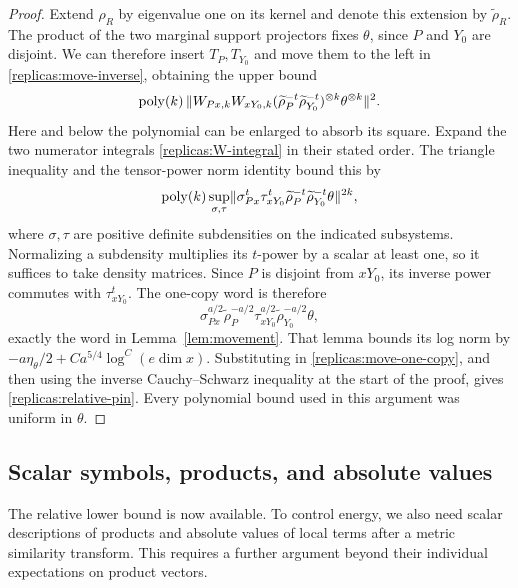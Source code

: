 \begin{proof}
Extend $\rho_R$ by eigenvalue one on its kernel and denote this
extension by $\widetilde\rho_R$.  The product of the two marginal
support projectors fixes $\theta$, since $P$ and $Y_0$ are disjoint.
We can therefore insert $T_P,T_{Y_0}$ and move them to the left in
\eqref{replicas:move-inverse}, obtaining the upper bound
\[
 \operatorname{poly}(k)\,
 \lVert W_{Px,k}W_{xY_0,k}
       (\widetilde\rho_P^{-t}\widetilde\rho_{Y_0}^{-t})^{\otimes k}
                                       \theta^{\otimes k}\rVert^2.
\]
Here and below the polynomial can be enlarged to absorb its square.
Expand the two numerator integrals
\eqref{replicas:W-integral} in their stated order.  The triangle
inequality and the tensor-power norm identity bound this by
\begin{equation}\label{replicas:move-one-copy}
 \operatorname{poly}(k)\sup_{\sigma,\tau}
 \lVert \sigma_{Px}^t\tau_{xY_0}^t
       \widetilde\rho_P^{-t}\widetilde\rho_{Y_0}^{-t}\theta\rVert^{2k},
\end{equation}
where $\sigma,\tau$ are positive definite subdensities on the
indicated subsystems.  Normalizing a subdensity multiplies its
$t$-power by a scalar at least one, so it suffices to take density
matrices.  Since $P$ is disjoint from $xY_0$, its inverse power
commutes with $\tau_{xY_0}^t$.  The one-copy word is therefore
\[
 \sigma_{Px}^{a/2}\widetilde\rho_P^{-a/2}
 \tau_{xY_0}^{a/2}\widetilde\rho_{Y_0}^{-a/2}\theta,
\]
exactly the word in Lemma~\ref{lem:movement}.
That lemma bounds its log norm by
$-a\eta_\theta/2+C a^{5/4}\log^C(e\dim x)$.
Substituting in \eqref{replicas:move-one-copy}, and then using the
inverse Cauchy--Schwarz inequality at the start of the proof, gives
\eqref{replicas:relative-pin}.  Every polynomial bound used in this
argument was uniform in $\theta$.
\end{proof}

\subsection{Scalar symbols, products, and absolute values}

The relative lower bound is now available.  To control energy, we also
need scalar descriptions of products and absolute values of local terms
after a metric similarity transform.  This requires a further argument
beyond their individual expectations on product vectors.


